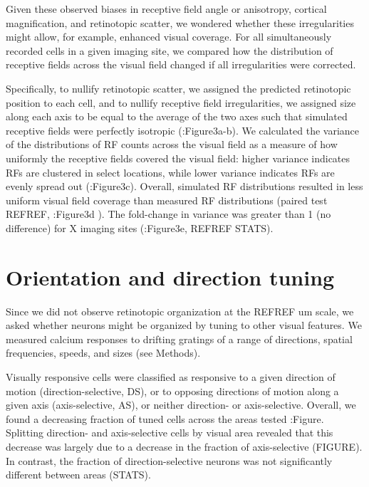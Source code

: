 Given these observed biases in receptive field angle or anisotropy, cortical magnification, and retinotopic scatter, we wondered whether these irregularities might allow, for example, enhanced visual coverage. For all simultaneously recorded cells in a given imaging site, we compared how the distribution of receptive fields across the visual field changed if all irregularities were corrected. 

Specifically, to nullify retinotopic scatter, we assigned the predicted retinotopic position to each cell, and to nullify receptive field irregularities, we assigned size along each axis to be equal to the average of the two axes such that simulated receptive fields were perfectly isotropic ({\fig:Figure3a-b}). We calculated the variance of the distributions of RF counts across the visual field as a measure of how uniformly the receptive fields covered the visual field:  higher variance indicates RFs are clustered in select locations, while lower variance indicates RFs are evenly spread out ({\fig:Figure3c}). Overall, simulated RF distributions resulted in less uniform visual field coverage than measured RF distributions (paired test REFREF, {\fig:Figure3d} ). The fold-change in variance was greater than 1 (no difference) for X imaging sites ({\fig:Figure3e}, REFREF STATS).  




\section{Orientation and direction tuning}
Since we did not observe retinotopic organization at the REFREF um scale, we asked whether neurons might be organized by tuning to other visual features. We measured calcium responses to drifting gratings of a range of directions, spatial frequencies, speeds, and sizes (see Methods). 

Visually responsive cells were classified as responsive to a given direction of motion (direction-selective, DS), or to opposing directions of motion along a given axis (axis-selective, AS), or neither direction- or axis-selective. Overall, we found a decreasing fraction of tuned cells across the areas tested {\fig:Figure}. Splitting direction- and axis-selective cells by visual area revealed that this decrease was largely due to a decrease in the fraction of axis-selective (FIGURE). In contrast, the fraction of direction-selective neurons was not significantly different between areas (STATS).   

